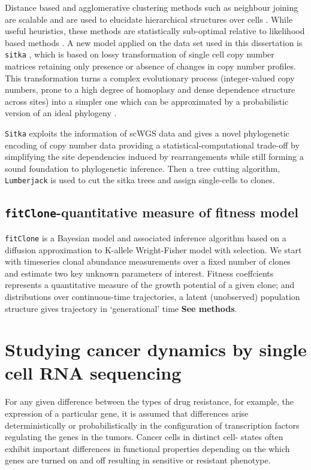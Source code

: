 Distance based and agglomerative clustering methods such as neighbour joining are scalable and are used to elucidate hierarchical
structures over cells \cite{wang2020single, xu2012single}. While useful heuristics, these methods are statistically sub-optimal relative to likelihood based methods \cite{williams2003investigation}. A new model applied on the data set used in this dissertation is \texttt{sitka} \cite{dorri2020efficient}, which is based on lossy transformation of single cell copy number matrices retaining only presence or absence of changes in copy number profiles. This transformation turns a complex evolutionary process (integer-valued copy numbers, prone to a high degree of homoplasy and dense dependence structure across sites) into a simpler one which can be approximated by a probabilistic version of an ideal phylogeny .

\texttt{Sitka} exploits the information of scWGS data and gives a novel phylogenetic encoding of copy number data providing a statistical-computational trade-off by simplifying the site dependencies induced by rearrangements while still forming a sound foundation to phylogenetic inference. Then a tree cutting algorithm, \texttt{Lumberjack} is used to cut the sitka trees and assign single-cells to clones.

\subsection{\texttt{fitClone}-quantitative measure of fitness model}
 \texttt{fitClone} is a Bayesian model and associated inference algorithm based on a diffusion approximation to K-allele Wright-Fisher model with selection. We start with timeseries clonal abundance measurements over a fixed number of clones and estimate two key unknown parameters of interest. Fitness coeffcients represents a quantitative measure of the growth potential of a given clone; and distributions over continuous-time trajectories, a latent (unobserved) population structure gives trajectory in `generational' time \textbf{See methods}.

\section{Studying cancer dynamics by single cell RNA sequencing}
For any given difference between the types of drug resistance, for example, the expression of a particular gene, it is assumed that differences arise deterministically or probabilistically in the configuration of transcription factors regulating the genes in the tumors. Cancer cells in distinct cell- states often exhibit important differences in functional properties depending on the which genes are turned on and off resulting in sensitive or resistant phenotype.

